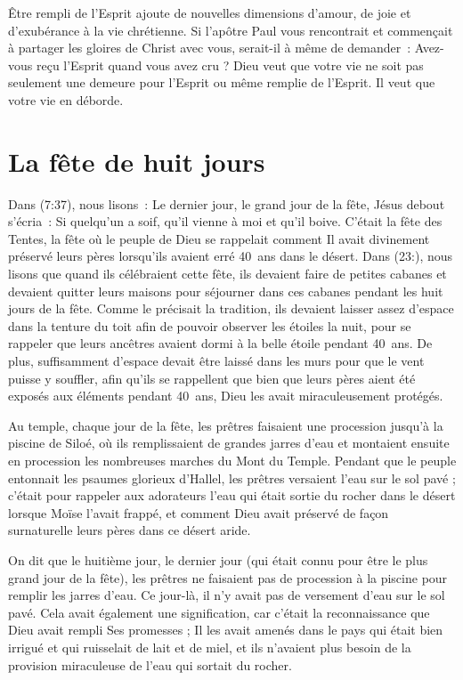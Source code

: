 Être rempli de l'Esprit ajoute de nouvelles dimensions d'amour,
 de joie et d'exubérance à la vie chrétienne.
 Si l'apôtre Paul vous rencontrait et commençait à partager les gloires
 de Christ avec vous, serait-il à même de demander~:
 \og Avez-vous reçu l'Esprit quand vous avez cru ? \fg{}
 Dieu veut que votre vie ne soit pas seulement une demeure
 pour l'Esprit ou même remplie de l'Esprit.
 Il veut que votre vie en déborde.


\section{La f\^ete de huit jours}

Dans (7:37), nous lisons~:
 \og Le dernier jour, le grand jour de la fête, Jésus debout s'écria~:
 Si quelqu'un a soif, qu'il vienne à moi et qu'il boive. \fg{}
 C'était la fête des Tentes, la fête où le peuple de Dieu se rappelait
 comment Il avait divinement préservé leurs pères lorsqu'ils avaient erré
 40~ans dans le désert.
 Dans (23:), nous lisons que quand ils célébraient cette fête,
 ils devaient faire de petites cabanes et devaient quitter leurs maisons
 pour séjourner dans ces cabanes pendant les huit jours de la fête.
 Comme le précisait la tradition, ils devaient laisser assez d'espace
 dans la tenture du toit afin de pouvoir observer les étoiles la nuit,
 pour se rappeler que leurs ancêtres avaient dormi à la belle étoile
 pendant 40~ans. De plus, suffisamment d'espace devait être laissé
 dans les murs pour que le vent puisse y souffler, afin qu'ils se rappellent
 que bien que leurs pères aient été exposés aux éléments pendant 40~ans,
 Dieu les avait miraculeusement protégés.

Au temple, chaque jour de la fête, les prêtres faisaient une procession
 jusqu'à la piscine de Siloé, où ils remplissaient de grandes jarres d'eau
 et montaient ensuite en procession les nombreuses marches du Mont du Temple.
 Pendant que le peuple entonnait les psaumes glorieux d'Hallel,
 les prêtres versaient l'eau sur le sol pavé ; c'était pour rappeler
 aux adorateurs l'eau qui était sortie du rocher dans le désert lorsque Moïse
 l'avait frappé, et comment Dieu avait préservé de façon surnaturelle
 leurs pères dans ce désert aride. 

On dit que le huitième jour, le dernier jour (qui était connu pour être
 le plus grand jour de la fête), les prêtres ne faisaient pas de procession
 à la piscine pour remplir les jarres d'eau.
 Ce jour-là, il n'y avait pas de versement d'eau sur le sol pavé.
 Cela avait également une signification, car c'était la reconnaissance
 que Dieu avait rempli Ses promesses ; Il les avait amenés dans le pays
 qui était bien irrigué et qui ruisselait de lait et de miel,
 et ils n'avaient plus besoin de la provision miraculeuse de l'eau
 qui sortait du rocher.

